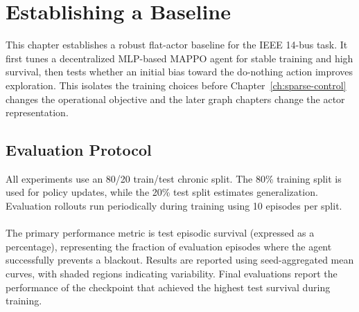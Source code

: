 \chapter{Establishing a Baseline}
\label{ch:baseline}

This chapter establishes a robust flat-actor baseline for the IEEE 14-bus task.
It first tunes a decentralized MLP-based MAPPO agent for stable training and
high survival, then tests whether an initial bias toward the do-nothing action
improves exploration. This isolates the training choices before
Chapter~\ref{ch:sparse-control} changes the operational objective and the later
graph chapters change the actor representation.




\section{Evaluation Protocol}
\label{sec:results-evaluation-protocol}

All experiments use an 80/20 train/test chronic split. The 80\% training split is used for policy updates, while the 20\% test split estimates generalization. Evaluation rollouts run periodically during training using 10 episodes per split. 
\\
\\
The primary performance metric is test episodic survival (expressed as a percentage), representing the fraction of evaluation episodes where the agent successfully prevents a blackout. Results are reported using seed-aggregated mean curves, with shaded regions indicating variability. Final evaluations report the performance of the checkpoint that achieved the highest test survival during training.

